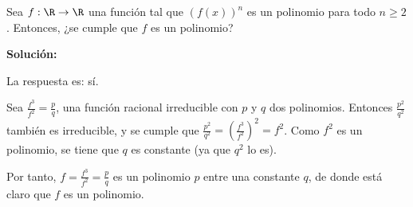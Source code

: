 \documentclass[../../main.tex]{subfiles}
\begin{document}
  \begin{shaded}
    Sea $f: \R \to \R$ una función tal que $(f(x))^n$ es un polinomio para todo $n \geq 2$. Entonces, ¿se cumple que $f$ es un polinomio?
  \end{shaded}

  \textbf{Solución:}

  La respuesta es: sí.

  Sea $\displaystyle\frac{f^3}{f^2} = \displaystyle\frac{p}{q}$, una función racional irreducible con $p$ y $q$ dos polinomios. Entonces $\displaystyle\frac{p^2}{q^2}$ también es irreducible, y se cumple que $\displaystyle\frac{p^2}{q^2} = \left(\displaystyle\frac{f^3}{f^2}\right)^2 = f^2$. Como $f^2$ es un polinomio, se tiene que $q$ es constante (ya que $q^2$ lo es).

  Por tanto, $f = \displaystyle\frac{f^3}{f^2} = \displaystyle\frac{p}{q}$ es un polinomio $p$ entre una constante $q$, de donde está claro que $f$ es un polinomio.
\end{document}
